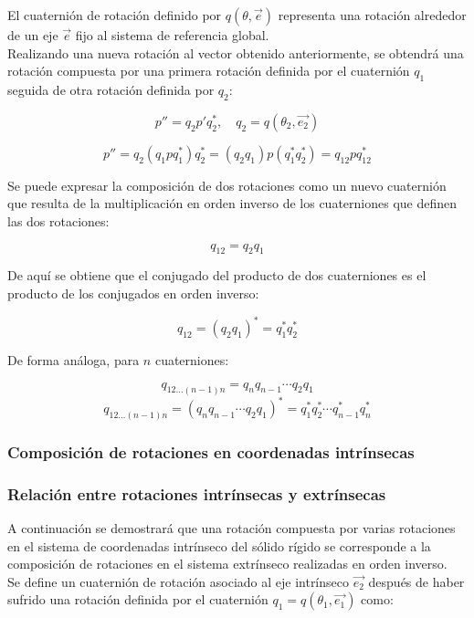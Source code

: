 \documentclass[10pt, a4paper]{report}
\begin{document}
El cuaternión de rotación definido por $q\left(\theta, \vec{e}\right)$ representa una rotación alrededor de un eje $\vec{e}$ fijo al sistema de referencia global.\\

Realizando una nueva rotación al vector obtenido anteriormente, se obtendrá una rotación compuesta por una primera rotación definida por el cuaternión $q_1$ seguida de otra rotación definida por $q_2$:

$$ p'' = q_2p'q_2^*, \quad q_2 = q(\theta_2, \vec{e_2})$$

$$ p'' = q_2(q_1pq_1^*)q_2^* = (q_2q_1)p(q_1^*q_2^*) = q_{12}pq_{12}^* $$

Se puede expresar la composición de dos rotaciones como un nuevo cuaternión que resulta de la multiplicación en orden inverso de los cuaterniones que definen las dos rotaciones:

$$ q_{12} = q_2q_1 $$

De aquí se obtiene que el conjugado del producto de dos cuaterniones es el producto de los conjugados en orden inverso:

$$ q_{12} = \left(q_2q_1\right)^* = q_1^*q_2^* $$

De forma análoga, para $n$ cuaterniones:

$$ q_{12 \dotsc (n-1)n} = q_nq_{n-1} \dotsm q_2q_1 $$
$$ q_{12 \dotsc (n-1)n} = \left( q_nq_{n-1} \dotsm q_2q_1 \right)^* = q_1^*q_2^* \dotsm q_{n-1}^*q_n^* $$

\subsubsection{Composición de rotaciones en coordenadas intrínsecas}



\subsubsection{Relación entre rotaciones intrínsecas y extrínsecas}

A continuación se demostrará que una rotación compuesta por varias rotaciones en el sistema de coordenadas intrínseco del sólido rígido se corresponde a la composición de rotaciones en el sistema extrínseco realizadas en orden inverso.\\

Se define un cuaternión de rotación asociado al eje intrínseco $\vec{e_2}$ después de haber sufrido una rotación definida por el cuaternión $q_1 = q\left( \theta_1 , \vec{e_1} \right)$ como:
\end{document}
